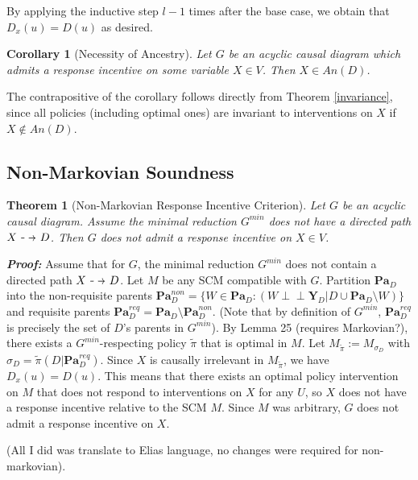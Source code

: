 \documentclass[letterpaper,10pt]{article}
\newtheorem{theorem}{Theorem}
\newtheorem{corollary}{Corollary}
\newcommand\dashto{\mathrel{
  -\mkern-6mu{\to}\mkern-20mu{\color{white}\bullet}\mkern12mu
}}
\newcommand\indep{\perp \!\!\! \perp}
\begin{document}
By applying the inductive step $l-1$ times after the base case, we obtain that $D_x(u)=D(u)$ as desired.

\begin{corollary}[Necessity of Ancestry]\label{ancestry}
Let $G$ be an acyclic causal diagram which admits a response incentive on some variable $X\in V$. Then $X\in An(D)$.
\end{corollary}

The contrapositive of the corollary follows directly from Theorem \ref{invariance}, since all policies (including optimal ones) are invariant to interventions on $X$ if $X\notin An(D)$.

\subsection{Non-Markovian Soundness}

\begin{theorem}[Non-Markovian Response Incentive Criterion]\label{nonmarkov}
Let $G$ be an acyclic causal diagram. Assume the minimal reduction $G^{min}$ does not have a directed path $X\dashto D$.
Then $G$ does not admit a response incentive on $X\in V$.
\end{theorem}

\textbf{\emph{Proof:}}
Assume that for $G$, the minimal reduction $G^{min}$ does not contain a directed path $X\dashto D$.
Let $M$ be any SCM compatible with $G$. 
Partition $\mathbf{Pa}_D$ into the non-requisite parents $\mathbf{Pa}^{non}_D=\{W\in \mathbf{Pa}_D : (W\indep \mathbf{Y}_D | D \cup \mathbf{Pa}_D \setminus W)\}$ and requisite parents $\mathbf{Pa}_D^{req}=\mathbf{Pa}_D\setminus\mathbf{Pa}^{non}_D$.
(Note that by definition of $G^{min}$, $\mathbf{Pa}_D^{req}$ is precisely the set of $D$'s parents in $G^{min}$).
By Lemma 25 \color{red} (requires Markovian?)\color{black}, there exists a $G^{min}$-respecting policy $\tilde{\pi}$ that is optimal in $M$. 
Let $M_{\tilde{\pi}}:=M_{\sigma_D}$ with $\sigma_D = \tilde{\pi} (D|\mathbf{Pa}^{req}_D)$.
Since $X$ is causally irrelevant in $M_{\tilde{\pi}}$, we have $D_x(u) = D(u)$. 
This means that there exists an optimal policy intervention on $M$ that does not respond to interventions on $X$ for any $U$, so $X$ does not have a response incentive relative to the SCM $M$. 
Since $M$ was arbitrary, $G$ does not admit a response incentive on $X$.

\color{red} (All I did was translate to Elias language, no changes were required for non-markovian). \color{black}
\end{document}
